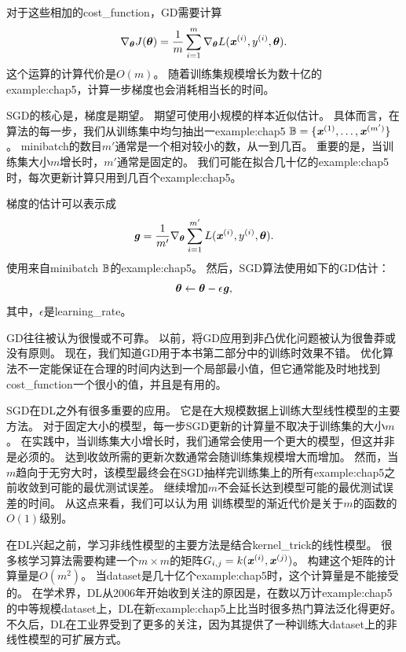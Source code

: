 对于这些相加的\gls{cost_function}，\gls{GD}需要计算
\begin{equation}
    \nabla_{\boldsymbol{\theta}} J(\boldsymbol{\theta})
    = \frac{1}{m} \sum_{i=1}^m  
    \nabla_{\boldsymbol{\theta}} L(\boldsymbol{\mathit{x}}^{(i)}, y^{(i)}, \boldsymbol{\theta}) .
\end{equation}
这个运算的计算代价是$O(m)$。
随着训练集规模增长为数十亿的\gls{example:chap5}，计算一步梯度也会消耗相当长的时间。

\gls{SGD}的核心是，梯度是期望。
期望可使用小规模的样本近似估计。
具体而言，在算法的每一步，我们从训练集中均匀抽出一\gls{example:chap5} $\mathbb{B}=\{\boldsymbol{\mathit{x}}^{(1)},\dots,\boldsymbol{\mathit{x}}^{(m')}\}$。
\gls{minibatch}的数目$m'$通常是一个相对较小的数，从一到几百。
重要的是，当训练集大小$m$增长时，$m'$通常是固定的。
我们可能在拟合几十亿的\gls{example:chap5}时，每次更新计算只用到几百个\gls{example:chap5}。

梯度的估计可以表示成
\begin{equation}
    \boldsymbol{\mathit{g}} = \frac{1}{m'} \nabla_{\boldsymbol{\theta}} \sum_{i=1}^{m'}
    L(\boldsymbol{\mathit{x}}^{(i)}, y^{(i)}, \boldsymbol{\theta}).
\end{equation}
使用来自\gls{minibatch} $\mathbb{B}$的\gls{example:chap5}。
然后，\gls{SGD}算法使用如下的\gls{GD}估计：
\begin{equation}
    \boldsymbol{\theta} \leftarrow \boldsymbol{\theta} - \epsilon \boldsymbol{\mathit{g}},
\end{equation}
其中，$\epsilon$是\gls{learning_rate}。

\gls{GD}往往被认为很慢或不可靠。
以前，将\gls{GD}应用到非凸优化问题被认为很鲁莽或没有原则。
现在，我们知道\gls{GD}用于本书第二部分中的训练时效果不错。
优化算法不一定能保证在合理的时间内达到一个局部最小值，但它通常能及时地找到\gls{cost_function}一个很小的值，并且是有用的。


\gls{SGD}在\gls{DL}之外有很多重要的应用。
它是在大规模数据上训练大型线性模型的主要方法。
对于固定大小的模型，每一步\gls{SGD}更新的计算量不取决于训练集的大小$m$。
在实践中，当训练集大小增长时，我们通常会使用一个更大的模型，但这并非是必须的。
达到收敛所需的更新次数通常会随训练集规模增大而增加。
然而，当$m$趋向于无穷大时，该模型最终会在\gls{SGD}抽样完训练集上的所有\gls{example:chap5}之前收敛到可能的最优测试误差。
继续增加$m$不会延长达到模型可能的最优测试误差的时间。
从这点来看，我们可以认为用\,\,训练模型的渐近代价是关于$m$的函数的$O(1)$级别。

在\gls{DL}兴起之前，学习非线性模型的主要方法是结合\gls{kernel_trick}的线性模型。
很多核学习算法需要构建一个$m\times m$的矩阵$G_{i,j}=k(\boldsymbol{\mathit{x}}^{(i)}, \boldsymbol{\mathit{x}}^{(j)})$。
构建这个矩阵的计算量是$O(m^2)$。
当\gls{dataset}是几十亿个\gls{example:chap5}时，这个计算量是不能接受的。
在学术界，\gls{DL}从2006年开始收到关注的原因是，在数以万计\gls{example:chap5}的中等规模\gls{dataset}上，\gls{DL}在新\gls{example:chap5}上比当时很多热门算法泛化得更好。
不久后，\gls{DL}在工业界受到了更多的关注，因为其提供了一种训练大\gls{dataset}上的非线性模型的可扩展方式。

